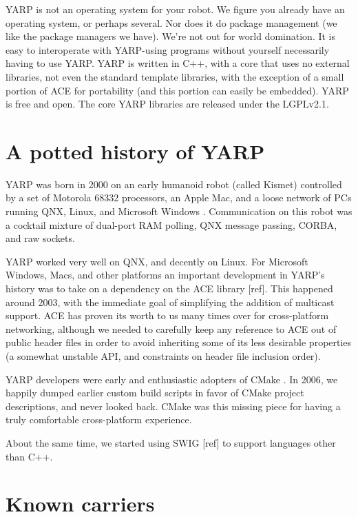 \documentclass[letterpaper]{article}
\begin{document}
YARP is not an operating system for your robot. We figure you already
have an operating system, or perhaps several. Nor does it do package
management (we like the package managers we have). We're not out for
world domination. It is easy to interoperate with YARP-using programs
without yourself necessarily having to use YARP. 
YARP is written in C++, with a core that uses
no external libraries, not even the standard template libraries, with
the exception of a small portion of ACE for portability (and this
portion can easily be embedded). YARP is free and open.  The
core YARP libraries are released under the LGPLv2.1.


\section{A potted history of YARP}

YARP was born in 2000 on an early humanoid robot (called Kismet)
controlled by a set of Motorola 68332 processors, an Apple Mac, and a
loose network of PCs running QNX, Linux, and Microsoft Windows
\cite{metta06yarp}.  Communication on this robot was a cocktail
mixture of dual-port RAM polling, QNX message passing, CORBA, and raw
sockets.

YARP worked very well on QNX, and decently on Linux.  For Microsoft
Windows, Macs, and other platforms an important development in YARP's
history was to take on a dependency on the ACE library [ref].  This
happened around 2003, with the immediate goal of simplifying the
addition of multicast support.  ACE has proven its worth to us many
times over for cross-platform networking, although we needed
to carefully keep any reference to ACE out of public header files
in order to avoid inheriting some of its less desirable properties
(a somewhat unstable API, and constraints on header file inclusion
order).

YARP developers were early and enthusiastic adopters of CMake
\cite{fitzpatrick10cmaking}.  In 2006, we happily dumped
earlier custom build scripts in favor of CMake project descriptions,
and never looked back.  CMake was this missing piece for having a
truly comfortable cross-platform experience.

About the same time, we started using SWIG [ref] to support languages
other than C++.

\section{Known carriers}
\end{document}
